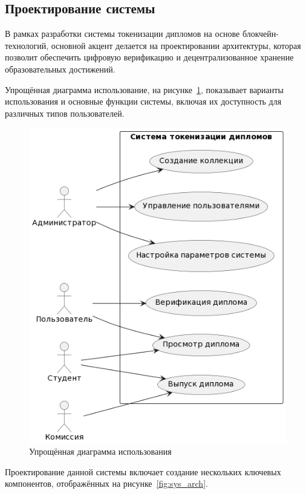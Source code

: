 \subsection{Проектирование системы}

В рамках разработки системы токенизации дипломов на основе блокчейн-технологий, основной акцент делается на проектировании архитектуры, которая позволит обеспечить цифровую верификацию и децентрализованное хранение образовательных достижений.

Упрощённая диаграмма использование, на рисунке~\ref{fig:uscs}, показывает варианты использования и основные функции системы, включая их доступность для различных типов пользователей.

\begin{figure}[H]
	\centering
	\includegraphics[width=.9\textwidth]{images/uscs.png}
	\parskip=6pt
	\caption{Упрощённая диаграмма использования}
	\label{fig:uscs}
\end{figure}

Проектирование данной системы включает создание нескольких ключевых компонентов, отображённых на рисунке~\ref{fig:sys_arch}.

